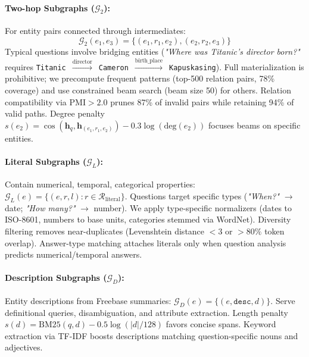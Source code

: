 \documentclass[conference]{IEEEtran}
\begin{document}
\paragraph{Two-hop Subgraphs ($\mathcal{G}_2$):}
For entity pairs connected through intermediates:
\begin{equation}
\mathcal{G}_2(e_1, e_3) = \{(e_1, r_1, e_2), (e_2, r_2, e_3)\}
\end{equation}
Typical questions involve bridging entities (\emph{"Where was Titanic's director born?"} requires \texttt{Titanic}~$\xrightarrow{\text{director}}$~\texttt{Cameron}~$\xrightarrow{\text{birth\_place}}$~\texttt{Kapuskasing}). Full materialization is prohibitive; we precompute frequent patterns (top-500 relation pairs, 78\% coverage) and use constrained beam search (beam size 50) for others. Relation compatibility via PMI${}> 2.0$ prunes 87\% of invalid pairs while retaining 94\% of valid paths. Degree penalty $s(e_2) = \cos(\mathbf{h}_q, \mathbf{h}_{(e_1,r_1,e_2)}) - 0.3 \log(\text{deg}(e_2))$ focuses beams on specific entities.

\paragraph{Literal Subgraphs ($\mathcal{G}_L$):}
Contain numerical, temporal, categorical properties: $\mathcal{G}_L(e) = \{(e, r, l) : r \in \mathcal{R}_{\text{literal}}\}$. Questions target specific types (\emph{"When?"} $\to$ date; \emph{"How many?"} $\to$ number). We apply type-specific normalizers (dates to ISO-8601, numbers to base units, categories stemmed via WordNet). Diversity filtering removes near-duplicates (Levenshtein distance ${}<3$ or ${}>80\%$ token overlap). Answer-type matching attaches literals only when question analysis predicts numerical/temporal answers.

\paragraph{Description Subgraphs ($\mathcal{G}_D$):}
Entity descriptions from Freebase summaries: $\mathcal{G}_D(e) = \{(e, \texttt{desc}, d)\}$. Serve definitional queries, disambiguation, and attribute extraction. Length penalty $s(d) = \text{BM25}(q, d) - 0.5 \log(|d| / 128)$ favors concise spans. Keyword extraction via TF-IDF boosts descriptions matching question-specific nouns and adjectives.
\end{document}
